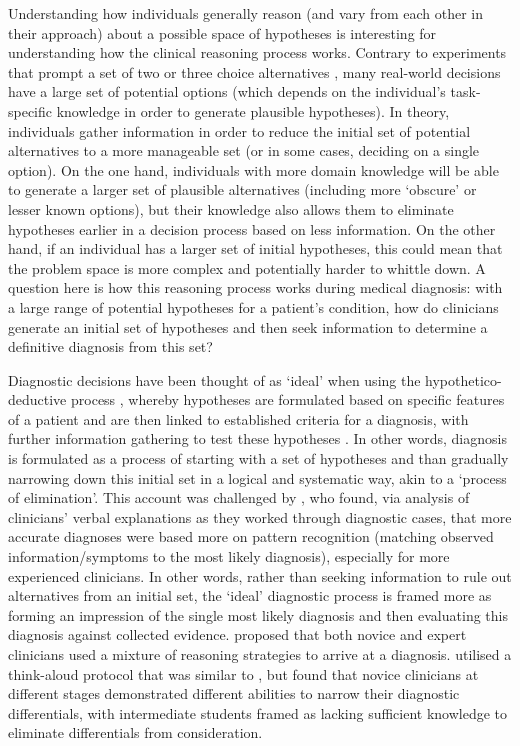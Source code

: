 \documentclass[a4paper, nobind]{templates/ociamthesis}
\begin{document}
\hfill\break
Understanding how individuals generally reason (and vary from each other in their approach) about a possible space of hypotheses is interesting for understanding how the clinical reasoning process works. Contrary to experiments that prompt a set of two or three choice alternatives \autocite{meyer_physicians_2013,chartan_isolating_2019,kuper_mitigating_2024}, many real-world decisions have a large set of potential options (which depends on the individual's task-specific knowledge in order to generate plausible hypotheses). In theory, individuals gather information in order to reduce the initial set of potential alternatives to a more manageable set (or in some cases, deciding on a single option). On the one hand, individuals with more domain knowledge will be able to generate a larger set of plausible alternatives (including more `obscure' or lesser known options), but their knowledge also allows them to eliminate hypotheses earlier in a decision process based on less information. On the other hand, if an individual has a larger set of initial hypotheses, this could mean that the problem space is more complex and potentially harder to whittle down. A question here is how this reasoning process works during medical diagnosis: with a large range of potential hypotheses for a patient's condition, how do clinicians generate an initial set of hypotheses and then seek information to determine a definitive diagnosis from this set?

\hfill\break
Diagnostic decisions have been thought of as `ideal' when using the hypothetico-deductive process \autocite{kuipers_causal_1984}, whereby hypotheses are formulated based on specific features of a patient and are then linked to established criteria for a diagnosis, with further information gathering to test these hypotheses \autocite{higgs_clinical_2019}. In other words, diagnosis is formulated as a process of starting with a set of hypotheses and than gradually narrowing down this initial set in a logical and systematic way, akin to a `process of elimination'. This account was challenged by \textcite{coderre_diagnostic_2003}, who found, via analysis of clinicians' verbal explanations as they worked through diagnostic cases, that more accurate diagnoses were based more on pattern recognition (matching observed information/symptoms to the most likely diagnosis), especially for more experienced clinicians. In other words, rather than seeking information to rule out alternatives from an initial set, the `ideal' diagnostic process is framed more as forming an impression of the single most likely diagnosis and then evaluating this diagnosis against collected evidence. \textcite{gilhooly_cognitive_1990} proposed that both novice and expert clinicians used a mixture of reasoning strategies to arrive at a diagnosis. \textcite{arocha_novice_1995} utilised a think-aloud protocol that was similar to \textcite{coderre_diagnostic_2003}, but found that novice clinicians at different stages demonstrated different abilities to narrow their diagnostic differentials, with intermediate students framed as lacking sufficient knowledge to eliminate differentials from consideration.
\end{document}

